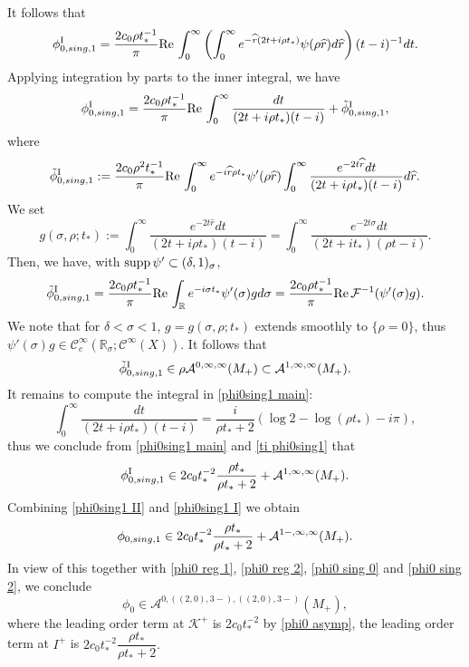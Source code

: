 \documentclass[10pt,a4paper,reqno]{amsart}
\renewcommand{\Re}{\operatorname{Re}}
\newcommand{\CI}{\mathcal{C}^\infty}
\newcommand{\CcI}{\mathcal{C}_c^\infty}
\newcommand{\RR}{\mathbb{R}}
\renewcommand\Re{\operatorname{Re}}
\newcommand{\A}{\mathcal{A}}
\newcommand{\ti}{\tilde}
\newcommand{\supp}{\text{supp\,}}
\let\hat\widehat
\theoremstyle{definition}
\theoremstyle{remark}
\numberwithin{equation}{section}
\renewcommand{\Re}{\mathrm{Re}\,}
\newcommand{\R}{\mathbb R}
\begin{document}
It follows that
\[
    \phi_{0,\rm{sing},1}^\text{I} = \frac{2c_0\rho t_*^{-1}}{\pi} \Re \int_0^\infty \left(\int_0^\infty e^{-\hat{r}(2t+i\rho t_*)}\psi(\rho\hat{r})d\hat{r}\right) (t-i)^{-1}dt.
\]
Applying integration by parts to the inner integral, we have
\begin{equation}
\label{phi0sing1 main}
    \phi_{0,\rm{sing},1}^\text{I} = \frac{2c_0\rho t_*^{-1}}{\pi} \Re \int_0^\infty \frac{dt}{(2t+i\rho t_*)(t-i)} + \ti{\phi}_{0,\rm{sing},1}^\text{I},
\end{equation}
where
\[
    \ti{\phi}_{0,\rm{sing},1}^\text{I} := \frac{2c_0\rho^2 t_*^{-1}}{\pi} \Re \int_0^\infty e^{-i\hat{r}\rho t_*}\psi'(\rho\hat{r}) \int_0^\infty \frac{e^{-2t\hat{r}} dt}{(2t+i\rho t_*)(t-i)} d\hat{r}.
\]
We set
\[
    g(\sigma,\rho;t_*) := \int_0^\infty \frac{e^{-2t\hat{r}} dt}{(2t+i\rho t_*)(t-i)} = \int_0^\infty \frac{e^{-2t\sigma}dt}{(2t+it_*)(\rho t - i)}.
\]
Then, we have, with $\supp\psi'\subset (\delta,1)_\sigma$,
\[
    \ti{\phi}_{0,\rm{sing},1}^\text{I} = \frac{2c_0 \rho t_*^{-1}}{\pi} \Re \int_{\R} e^{-i\sigma t_*}\psi'(\sigma) g d\sigma = \frac{2c_0\rho t_*^{-1}}{\pi} \Re \mathcal{F}^{-1}(\psi'(\sigma)g).
\]
We note that for $\delta<\sigma<1$, $g=g(\sigma,\rho;t_*)$ extends smoothly to $\{\rho=0\}$, thus $\psi'(\sigma) g \in \CcI(\RR_{\sigma}; \CI(X))$. It follows that
\begin{equation}
\label{ti phi0sing1}
    \ti{\phi}_{0,\rm{sing},1}^\text{I} \in \rho \A^{0,\infty,\infty}(M_+)\subset \A^{1,\infty,\infty}(M_+).
\end{equation}
It remains to compute the integral in \eqref{phi0sing1 main}:
\[
    \int_0^\infty \frac{dt}{(2t+i\rho t_*)(t-i)} = \frac{i}{\rho t_* + 2}(\log 2 - \log(\rho t_*) - i\pi),
\]
thus we conclude from \eqref{phi0sing1 main} and \eqref{ti phi0sing1} that
\begin{equation}
\label{phi0sing1 I}
    \phi_{0,\rm{sing},1}^\text{I} \in 2c_0 t_*^{-2} \frac{\rho t_*}{\rho t_* + 2} + \A^{1,\infty,\infty}(M_+).
\end{equation}
Combining \eqref{phi0sing1 II} and \eqref{phi0sing1 I} we obtain 
\begin{equation}
\label{phi0sing1 final}
    \phi_{0,\rm{sing},1} \in 2c_0 t_*^{-2} \frac{\rho t_*}{\rho t_* + 2} + \A^{1-,\infty,\infty}(M_+).
\end{equation}
In view of this together with \eqref{phi0 reg 1}, \eqref{phi0 reg 2}, \eqref{phi0 sing 0} and \eqref{phi0 sing 2}, we conclude
\begin{equation}
\label{phi0globalasymp}
    \phi_0 \in \A^{0,((2,0),3-),((2,0),3-)}(M_+),
\end{equation}
where the leading order term at $\mathcal{K}^+$ is $2c_0 t_*^{-2}$ by \eqref{phi0 asymp}, the leading order term at $I^+$ is $2c_0 t_*^{-2} \dfrac{\rho t_*}{\rho t_* + 2}.$
\end{document}
